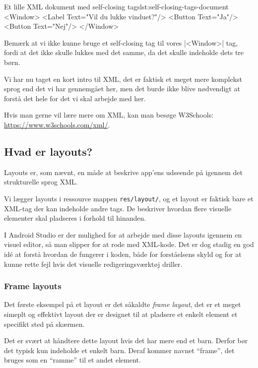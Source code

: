 \begin{example}
	\begin{XmlCode}{Et lille XML dokument med self-closing tags}{lst:self-closing-tags-document}
		<Window>
			<Label Text="Vil du lukke vinduet?"/>
			<Button Text="Ja"/>
			<Button Text="Nej"/>
		</Window>
	\end{XmlCode}
\end{example}

\begin{remark}
	Bemærk at vi ikke kunne bruge et self-closing tag til vores \XmlInline|<Window>| tag, fordi at det ikke skulle lukkes med det samme, da det skulle indeholde dets tre børn.
\end{remark}

Vi har nu taget en kort intro til XML, det er faktisk et meget mere komplekst sprog end det vi har gennemgået her, men det burde ikke blive nødvendigt at forstå det hele for det vi skal arbejde med her.

Hvis man gerne vil lære mere om XML, kan man besøge W3Schools: \url{https://www.w3schools.com/xml/}.


\subsection{Hvad er layouts?}
Layouts er, som nævnt, en måde at beskrive app'ens udseende på igennem det strukturelle sprog XML.

Vi lægger layouts i ressource mappen \texttt{res/layout/}, og et layout er 
faktisk bare et XML-tag der kan indeholde andre tags. De beskriver hvordan 
flere visuelle elementer skal pladseres i forhold til hinanden.

I Android Studio er der mulighed for at arbejde med disse layouts igennem en 
visuel editor, så man slipper for at rode med XML-kode. Det er dog stadig en 
god idé at forstå hvordan de fungerer i koden, både for forståelsens skyld og 
for at kunne rette fejl hvis det visuelle redigeringsværktøj driller.

\subsubsection{Frame layouts}

Det første eksempel på et layout er det såkaldte \textit{frame layout}, det er et meget simeplt og effektivt layout der er designet til at pladsere et enkelt element et specifikt sted på skærmen.

Det er svært at håndtere dette layout hvis det har mere end et barn. Derfor bør 
det typisk kun indeholde et enkelt barn. Deraf kommer navnet ``frame'', det 
bruges som en ``ramme'' til et andet element.

